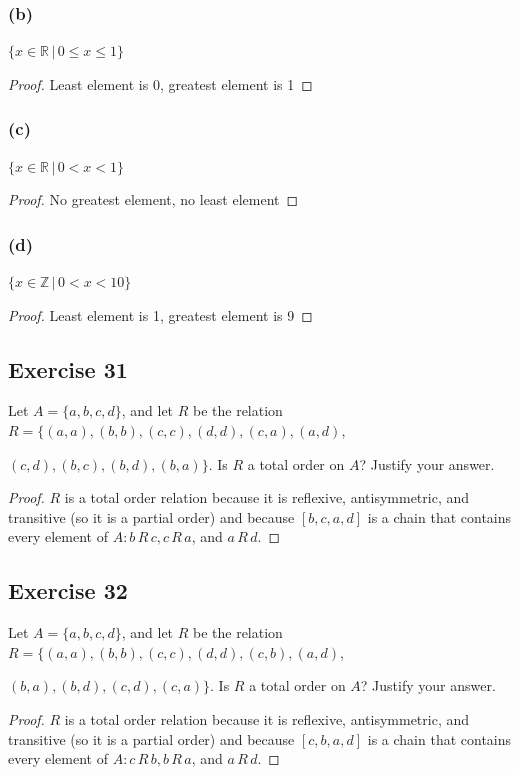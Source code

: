 \documentclass[14pt]{extarticle}
\newcommand{\R}{\mathbb{R}}
\newcommand{\Z}{\mathbb{Z}}
\begin{document}
\subsubsection{(b)}
\(\{x \in \R \,|\, 0 \leq x \leq 1\}\)
\begin{proof}
        Least element is 0, greatest element is 1
\end{proof}

\subsubsection{(c)}
\(\{x \in \R \,|\, 0 < x < 1\}\)
\begin{proof}
        No greatest element, no least element
\end{proof}

\subsubsection{(d)}
\(\{x \in \Z \,|\, 0 < x < 10\}\)
\begin{proof}
        Least element is 1, greatest element is 9
\end{proof}

\subsection{Exercise 31}
Let \(A = \{a, b, c, d\}\), and let \(R\) be the relation \(R = \{(a, a), (b, b), (c, c), (d, d), (c, a), (a, d)\),

\((c, d), (b, c), (b, d), (b, a)\}\). Is \(R\) a total order on \(A\)? Justify your answer.

\begin{proof}
        $R$ is a total order relation because it is reflexive, antisymmetric, and transitive (so it is a partial order)
        and because \([b, c, a, d]\) is a chain that contains every element of \(A: b \,R\, c, c \,R\, a\), and \(a \,R\, d\).
\end{proof}

\subsection{Exercise 32}
Let \(A = \{a, b, c, d\}\), and let \(R\) be the relation \(R = \{(a, a), (b, b), (c, c), (d, d), (c, b), (a, d)\),

\((b, a), (b, d), (c, d), (c, a)\}\). Is \(R\) a total order on \(A\)? Justify your answer.

\begin{proof}
        $R$ is a total order relation because it is reflexive, antisymmetric, and transitive (so it is a partial order)
        and because \([c, b, a, d]\) is a chain that contains every element of \(A: c \,R\, b, b \,R\, a\), and \(a \,R\, d\).
\end{proof}
\end{document}
